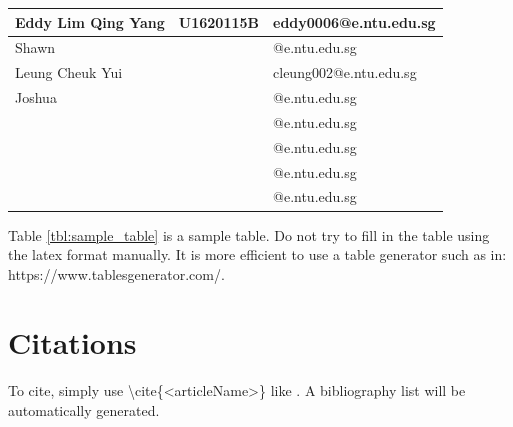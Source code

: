 \begin{table}[!htbp]
\centering
\begin{tabular}{|l|l|l|}
\hline
Eddy Lim Qing Yang & U1620115B & eddy0006@e.ntu.edu.sg \\ \hline
Shawn & & @e.ntu.edu.sg \\ \hline
Leung Cheuk Yui & & cleung002@e.ntu.edu.sg \\ \hline
Joshua & & @e.ntu.edu.sg \\ \hline
& & @e.ntu.edu.sg \\ \hline
& & @e.ntu.edu.sg \\ \hline
& & @e.ntu.edu.sg \\ \hline
& & @e.ntu.edu.sg \\ \hline
\end{tabular}
\end{table}
\label{tbl:sample_table}

Table \ref{tbl:sample_table} is a sample table. Do not try to fill in the table using the latex format manually. It is more efficient to use a table generator such as in: https://www.tablesgenerator.com/.

\section{Citations}
To cite, simply use \textbackslash cite\{<articleName>\} like \cite{gunther2010neuralnet}. A bibliography list will be automatically generated.